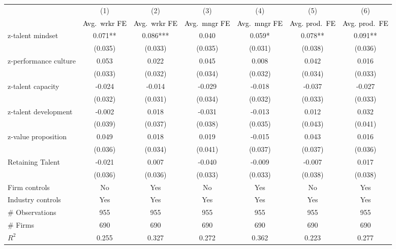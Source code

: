 
\begin{tabular}{l*{6}{c}}
\toprule
                &\multicolumn{1}{c}{(1)}&\multicolumn{1}{c}{(2)}&\multicolumn{1}{c}{(3)}&\multicolumn{1}{c}{(4)}&\multicolumn{1}{c}{(5)}&\multicolumn{1}{c}{(6)}\\
                &\multicolumn{1}{c}{\textcolor{black}{Avg.\ wrkr FE}}&\multicolumn{1}{c}{\textcolor{black}{Avg.\ wrkr FE}}&\multicolumn{1}{c}{\textcolor{black}{Avg.\ mngr FE}}&\multicolumn{1}{c}{\textcolor{black}{Avg.\ mngr FE}}&\multicolumn{1}{c}{\textcolor{black}{Avg. prod.\ FE}}&\multicolumn{1}{c}{\textcolor{black}{Avg. prod.\ FE}}\\
\midrule
z-talent mindset        &    0.071** &    0.086***&    0.040   &    0.059*  &    0.078** &    0.091** \\
                &  (0.035)   &  (0.033)   &  (0.035)   &  (0.031)   &  (0.038)   &  (0.036)   \\
z-performance culture        &    0.053   &    0.022   &    0.045   &    0.008   &    0.042   &    0.016   \\
                &  (0.033)   &  (0.032)   &  (0.034)   &  (0.032)   &  (0.034)   &  (0.033)   \\
z-talent capacity        &   -0.024   &   -0.014   &   -0.029   &   -0.018   &   -0.037   &   -0.027   \\
                &  (0.032)   &  (0.031)   &  (0.034)   &  (0.032)   &  (0.033)   &  (0.033)   \\
z-talent development        &   -0.002   &    0.018   &   -0.031   &   -0.013   &    0.012   &    0.032   \\
                &  (0.039)   &  (0.037)   &  (0.038)   &  (0.035)   &  (0.043)   &  (0.041)   \\
z-value proposition        &    0.049   &    0.018   &    0.019   &   -0.015   &    0.043   &    0.016   \\
                &  (0.036)   &  (0.034)   &  (0.041)   &  (0.037)   &  (0.037)   &  (0.036)   \\
Retaining Talent        &   -0.021   &    0.007   &   -0.040   &   -0.009   &   -0.007   &    0.017   \\
                &  (0.036)   &  (0.036)   &  (0.033)   &  (0.033)   &  (0.038)   &  (0.038)   \\
Firm controls   &       No   &      Yes   &       No   &      Yes   &       No   &      Yes   \\
Industry controls &      Yes   &      Yes   &      Yes   &      Yes   &      Yes   &      Yes   \\
\midrule
\# Observations &\multicolumn{1}{c}{955}   &\multicolumn{1}{c}{955}   &\multicolumn{1}{c}{955}   &\multicolumn{1}{c}{955}   &\multicolumn{1}{c}{955}   &\multicolumn{1}{c}{955}   \\
\# Firms        &      690   &      690   &      690   &      690   &      690   &      690   \\
\(R^{2}\)       &    0.255   &    0.327   &    0.272   &    0.362   &    0.223   &    0.277   \\
\bottomrule
\end{tabular}


